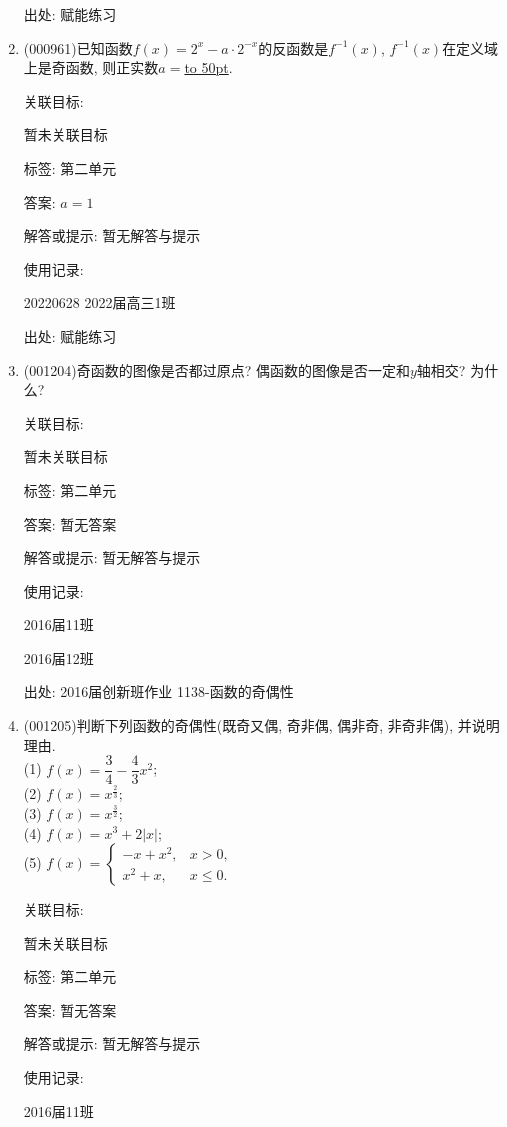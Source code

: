 \documentclass[10pt,a4paper]{article}
\newcommand{\blank}[1]{\underline{\hbox to #1pt{}}}
\begin{document}
\begin{enumerate}[1.]
出处: 赋能练习
\item { (000961)}已知函数$f(x)=2^x-a\cdot 2^{-x}$的反函数是$f^{-1}(x)$, $f^{-1}(x)$在定义域上是奇函数, 则正实数$a=$\blank{50}.


关联目标:

暂未关联目标



标签: 第二单元

答案: $a=1$

解答或提示: 暂无解答与提示

使用记录:

20220628	2022届高三1班	


出处: 赋能练习
\item { (001204)}奇函数的图像是否都过原点? 偶函数的图像是否一定和$y$轴相交? 为什么?


关联目标:

暂未关联目标



标签: 第二单元

答案: 暂无答案

解答或提示: 暂无解答与提示

使用记录:

2016届11班	

2016届12班	


出处: 2016届创新班作业	1138-函数的奇偶性
\item { (001205)}判断下列函数的奇偶性(既奇又偶, 奇非偶, 偶非奇, 非奇非偶), 并说明理由.\\ 
(1) $f(x)=\dfrac{3}{4}-\dfrac{4}{3}x^2$;\\ 
(2) $f(x)=x^{\frac{2}{3}}$;\\ 
(3) $f(x)=x^{\frac{3}{2}}$;\\ 
(4) $f(x)=x^3+2|x|$;\\ 
(5) $f(x)=\left\{\begin{array}{ll}-x+x^2,& x>0,\\x^2+x,& x\le 0.\end{array}\right.$


关联目标:

暂未关联目标



标签: 第二单元

答案: 暂无答案

解答或提示: 暂无解答与提示

使用记录:

2016届11班					


\end{enumerate}
\end{document}
